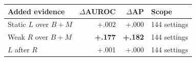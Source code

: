 \begin{center}
\centering
\small
{}
\label{tab:prediction-ablation}
\begin{tabular}{@{}lrrl@{}}
\toprule
Added evidence & $\Delta$AUROC & $\Delta$AP & Scope \\
\midrule
Static $L$ over $B+M$ & +.002 & +.000 & 144 settings \\
Weak $R$ over $B+M$ & \textbf{+.177} & \textbf{+.182} & 144 settings \\
$L$ after $R$ & +.001 & +.000 & 144 settings \\
\bottomrule
\end{tabular}
\end{center}
